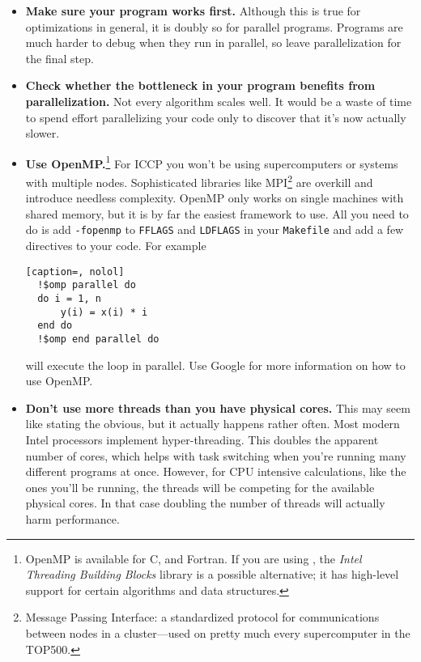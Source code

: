 \begin{itemize}
  \item\textbf{Make sure your program works first.} Although this is true for optimizations in general, it is doubly so for parallel programs.
    Programs are much harder to debug when they run in parallel, so leave parallelization for the final step.
  \item\textbf{Check whether the bottleneck in your program benefits from parallelization.} Not every algorithm scales well.
    It would be a waste of time to spend effort parallelizing your code only to discover that it's now actually slower.
  \item\textbf{Use OpenMP.}\footnote{OpenMP is available for C, \Cplusplus{} and Fortran.
    If you are using \Cplusplus, the \emph{Intel Threading Building Blocks} library is a possible alternative; it has high-level support for certain algorithms and data structures.} For ICCP you won't be using supercomputers or systems with multiple nodes.
    Sophisticated libraries like MPI\footnote{Message Passing Interface: a standardized protocol for communications between nodes in a cluster---used on pretty much every supercomputer in the TOP500.} are overkill and introduce needless complexity.
    OpenMP only works on single machines with shared memory, but it is by far the easiest framework to use.
    All you need to do is add \texttt{-fopenmp} to \texttt{FFLAGS} and \texttt{LDFLAGS} in your \texttt{Makefile} and add a few directives to your code.
    For example
\begin{lstlisting}[caption=, nolol]
  !$omp parallel do
  do i = 1, n
      y(i) = x(i) * i
  end do
  !$omp end parallel do
\end{lstlisting}
    will execute the loop in parallel. Use Google for more information on how to use OpenMP.
  \item\textbf{Don't use more threads than you have physical cores.} This may seem like stating the obvious, but it actually happens rather often.
  Most modern Intel processors implement hyper-threading.
  This doubles the apparent number of cores, which helps with task switching when you're running many different programs at once.
  However, for CPU intensive calculations, like the ones you'll be running, the threads will be competing for the available physical cores.
  In that case doubling the number of threads will actually harm performance.
\end{itemize}

